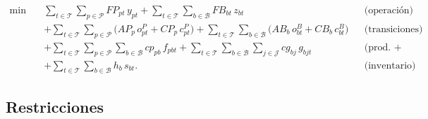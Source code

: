\documentclass[11pt]{article}
\begin{document}
\begin{align*}
\min \quad
&\sum_{t\in\mathcal{T}}\sum_{p\in\mathcal{P}} \mathit{FP}_{pt}\,y_{pt}
+ \sum_{t\in\mathcal{T}}\sum_{b\in\mathcal{B}} \mathit{FB}_{bt}\,z_{bt}
&& \text{(operación)}\\
&+ \sum_{t\in\mathcal{T}}\sum_{p\in\mathcal{P}}\!\big(\mathit{AP}_{p}\,o^{P}_{pt} + \mathit{CP}_{p}\,c^{P}_{pt}\big)
+ \sum_{t\in\mathcal{T}}\sum_{b\in\mathcal{B}}\!\big(\mathit{AB}_{b}\,o^{B}_{bt} + \mathit{CB}_{b}\,c^{B}_{bt}\big)
&& \text{(transiciones)}\\
&+ \sum_{t\in\mathcal{T}}\sum_{p\in\mathcal{P}}\sum_{b\in\mathcal{B}} \mathit{cp}_{pb}\,f_{pbt}
+ \sum_{t\in\mathcal{T}}\sum_{b\in\mathcal{B}}\sum_{j\in\mathcal{J}} \mathit{cg}_{bj}\,g_{bjt}
&& \text{(prod.\ + transporte)}\\
&+ \sum_{t\in\mathcal{T}}\sum_{b\in\mathcal{B}} h_{b}\,s_{bt}.
&& \text{(inventario)}
\end{align*}

\subsection*{Restricciones}
\end{document}

